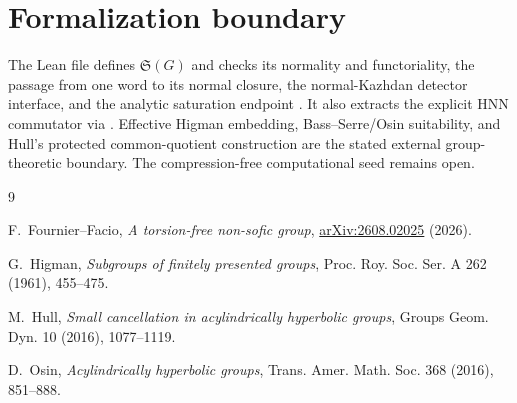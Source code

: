 \documentclass[10pt]{amsart}
\theoremstyle{definition}
\theoremstyle{remark}
\newcommand{\Shadow}{\mathfrak S}
\begin{document}
\section{Formalization boundary}

The Lean file
 defines
$\Shadow(G)$ and checks its normality and functoriality, the passage from one
word to its normal closure, the normal-Kazhdan detector interface, and the
analytic saturation endpoint
.  It also
extracts the explicit HNN commutator via
.
Effective Higman embedding, Bass--Serre/Osin suitability, and Hull's
protected common-quotient construction are the stated external
group-theoretic boundary.  The compression-free computational seed remains
open.

\begin{thebibliography}{9}

F.~Fournier--Facio,
\emph{A torsion-free non-sofic group},
\href{https://arxiv.org/abs/2608.02025}{arXiv:2608.02025} (2026).

G.~Higman,
\emph{Subgroups of finitely presented groups},
Proc. Roy. Soc. Ser. A 262 (1961), 455--475.

M.~Hull,
\emph{Small cancellation in acylindrically hyperbolic groups},
Groups Geom. Dyn. 10 (2016), 1077--1119.

D.~Osin,
\emph{Acylindrically hyperbolic groups},
Trans. Amer. Math. Soc. 368 (2016), 851--888.

\end{thebibliography}
\end{document}

